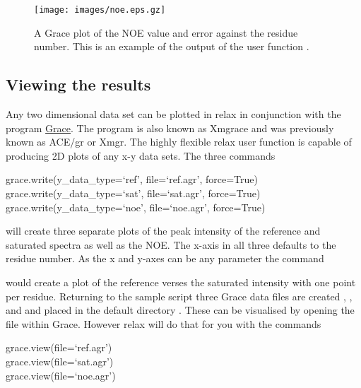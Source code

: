
\begin{figure}
\centerline{\texttt{[image: images/noe.eps.gz]}}
\caption[NOE plot]{A Grace plot of the NOE value and error against the residue number.  This is an example of the output of the user function .}\label{fig: NOE plot}
\end{figure}


\subsection{Viewing the results}

Any two dimensional data set can be plotted in relax in conjunction with the program \href{http://plasma-gate.weizmann.ac.il/Grace/}{Grace}.  The program is also known as Xmgrace and was previously known as ACE/gr or Xmgr.  The highly flexible relax user function  is capable of producing 2D plots of any x-y data sets.  The three commands

\begin{exampleenv}
grace.write(y\_data\_type=`ref', file=`ref.agr', force=True) \\
grace.write(y\_data\_type=`sat', file=`sat.agr', force=True) \\
grace.write(y\_data\_type=`noe', file=`noe.agr', force=True)
\end{exampleenv}

will create three separate plots of the peak intensity of the reference and saturated spectra as well as the NOE.  The x-axis in all three defaults to the residue number.  As the x and y-axes can be any parameter the command


would create a plot of the reference verses the saturated intensity with one point per residue.  Returning to the sample script three Grace data files are created , , and  and placed in the default directory .  These can be visualised by opening the file within Grace.  However relax will do that for you with the commands

\begin{exampleenv}
grace.view(file=`ref.agr') \\
grace.view(file=`sat.agr') \\
grace.view(file=`noe.agr')
\end{exampleenv}

